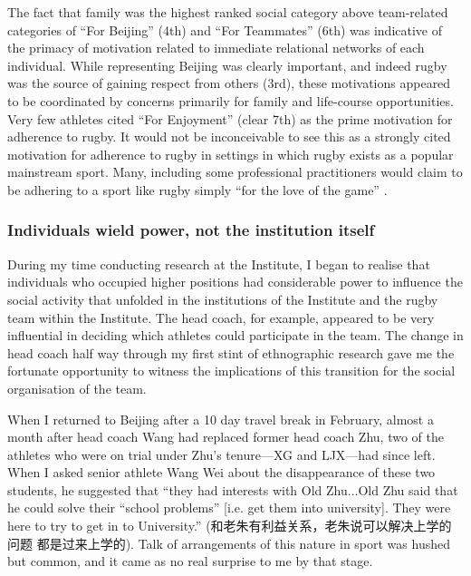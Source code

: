 \begin{CJK}{UTF8}{gbsn}
The fact that family was the highest ranked social category above team-related categories of ``For Beijing'' (4th) and ``For Teammates'' (6th) was indicative of the primacy of motivation related to immediate relational networks of each individual.  While representing Beijing was clearly important, and indeed rugby was the source of gaining respect from others (3rd), these motivations appeared to be coordinated by concerns primarily for family and life-course opportunities.  Very few athletes cited ``For Enjoyment'' (clear 7th) as the prime motivation for adherence to rugby.  It would not be inconceivable to see this as a strongly cited motivation for adherence to rugby in settings in which rugby exists as a popular mainstream sport.  Many, including some professional practitioners would claim to be adhering to a sport like rugby simply ``for the love of the game'' \citep{}.

\subsubsection{Individuals wield power, not the institution itself}
During my time conducting research at the Institute, I began to realise that individuals who occupied higher positions had considerable power to influence the social activity that unfolded in the institutions of the Institute and the rugby team within the Institute.   The head coach, for example, appeared to be very influential in deciding which athletes could participate in the team.  The change in head coach half way through my first stint of ethnographic research gave me the fortunate opportunity to witness the implications of this transition for the social organisation of the team.

When I returned to Beijing after a 10 day travel break in February, almost a month after head coach Wang had replaced former head coach Zhu, two of the athletes who were on trial under Zhu's tenure---XG and LJX---had since left.  When I asked senior athlete Wang Wei about the disappearance of these two students, he suggested that ``they had interests with Old Zhu...Old Zhu said that he could solve their ``school problems'' [i.e. get them into university]. They were here to try to get in to University.'' (和老朱有利益关系，老朱说可以解决上学的问题 都是过来上学的). Talk of arrangements of this nature in sport was hushed but common, and it came as no real surprise to me by that stage.


\end{CJK}
